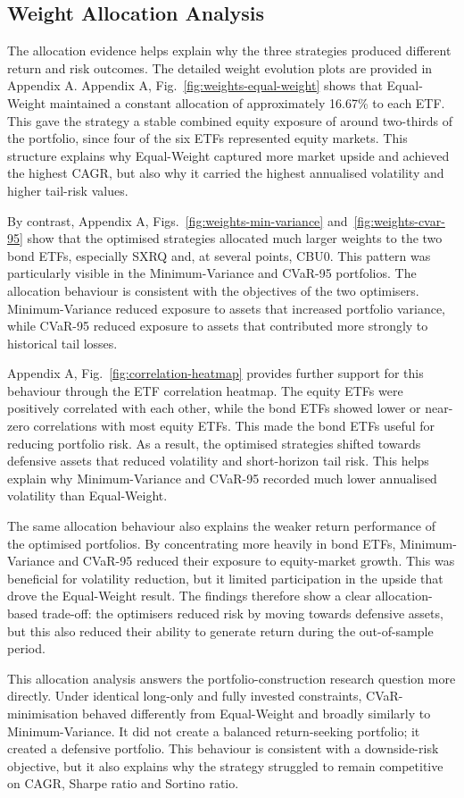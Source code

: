 \subsection{Weight Allocation Analysis}
\par The allocation evidence helps explain why the three strategies produced different return and risk outcomes. The detailed weight evolution plots are provided in Appendix A. Appendix A, Fig.~\ref{fig:weights-equal-weight} shows that Equal-Weight maintained a constant allocation of approximately 16.67\% to each ETF. This gave the strategy a stable combined equity exposure of around two-thirds of the portfolio, since four of the six ETFs represented equity markets. This structure explains why Equal-Weight captured more market upside and achieved the highest CAGR, but also why it carried the highest annualised volatility and higher tail-risk values.
\par By contrast, Appendix A, Figs.~\ref{fig:weights-min-variance} and~\ref{fig:weights-cvar-95} show that the optimised strategies allocated much larger weights to the two bond ETFs, especially SXRQ and, at several points, CBU0. This pattern was particularly visible in the Minimum-Variance and CVaR-95 portfolios. The allocation behaviour is consistent with the objectives of the two optimisers. Minimum-Variance reduced exposure to assets that increased portfolio variance, while CVaR-95 reduced exposure to assets that contributed more strongly to historical tail losses.
\par Appendix A, Fig.~\ref{fig:correlation-heatmap} provides further support for this behaviour through the ETF correlation heatmap. The equity ETFs were positively correlated with each other, while the bond ETFs showed lower or near-zero correlations with most equity ETFs. This made the bond ETFs useful for reducing portfolio risk. As a result, the optimised strategies shifted towards defensive assets that reduced volatility and short-horizon tail risk. This helps explain why Minimum-Variance and CVaR-95 recorded much lower annualised volatility than Equal-Weight.
\par The same allocation behaviour also explains the weaker return performance of the optimised portfolios. By concentrating more heavily in bond ETFs, Minimum-Variance and CVaR-95 reduced their exposure to equity-market growth. This was beneficial for volatility reduction, but it limited participation in the upside that drove the Equal-Weight result. The findings therefore show a clear allocation-based trade-off: the optimisers reduced risk by moving towards defensive assets, but this also reduced their ability to generate return during the out-of-sample period.
\par This allocation analysis answers the portfolio-construction research question more directly. Under identical long-only and fully invested constraints, CVaR-minimisation behaved differently from Equal-Weight and broadly similarly to Minimum-Variance. It did not create a balanced return-seeking portfolio; it created a defensive portfolio. This behaviour is consistent with a downside-risk objective, but it also explains why the strategy struggled to remain competitive on CAGR, Sharpe ratio and Sortino ratio.

